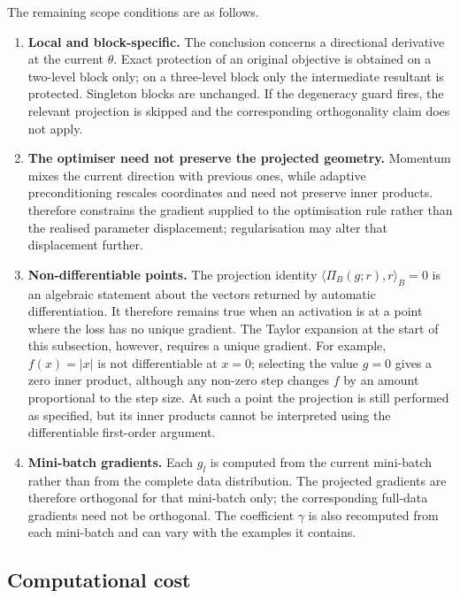 The remaining scope conditions are as follows.

\begin{enumerate}
    \item \textbf{Local and block-specific.} The conclusion concerns a
    directional derivative at the current $\theta$. Exact protection of an
    original objective is obtained on a two-level block only; on a
    three-level block only the intermediate resultant is protected. Singleton
    blocks are unchanged. If the degeneracy guard fires, the relevant projection is skipped and the
    corresponding orthogonality claim does not apply.
    \item \textbf{The optimiser need not preserve the projected geometry.}
    Momentum mixes the current direction with previous ones, while adaptive
    preconditioning rescales coordinates and need not preserve inner products.
     therefore constrains the gradient supplied to the
    optimisation rule rather than the realised parameter displacement; regularisation
    may alter that displacement further.
    \item \textbf{Non-differentiable points.} The projection identity
    $\langle\Pi_B(g;r),r\rangle_B=0$ is an algebraic statement about the vectors
    returned by automatic differentiation. It therefore remains true when an
    activation is at a point where the loss has no unique gradient. The Taylor
    expansion at the start of this subsection, however, requires a unique
    gradient. For example, $f(x)=|x|$ is not differentiable at $x=0$; selecting
    the value $g=0$ gives a zero inner product, although any non-zero step changes
    $f$ by an amount proportional to the step size. At such a point the
    projection is still performed as specified, but its inner products cannot be
    interpreted using the differentiable first-order argument.
    \item \textbf{Mini-batch gradients.} Each $g_l$ is computed from the current
    mini-batch rather than from the complete data distribution. The projected
    gradients are therefore orthogonal for that mini-batch only; the
    corresponding full-data gradients need not be orthogonal. The coefficient
    $\gamma$ is also recomputed from each mini-batch and can vary with the
    examples it contains.
\end{enumerate}

\subsection{Computational cost}
\label{ssec:lex_cost}

